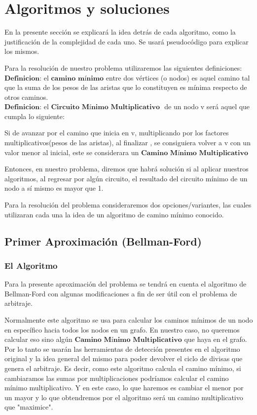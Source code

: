 \documentclass[11pt,a4paper]{article}
\begin{document}
\section{\huge Algoritmos y soluciones}

En la presente secci\'on se explicar\'a la idea detr\'as de cada algoritmo, como la justificaci\'on de la complejidad de cada uno. Se usar\'a pseudoc\'odigo para explicar los mismos.


Para la resoluci\'on de nuestro problema utilizaremos las siguientes definiciones:
\\

{\large $\textbf{Definicion:}$} el $\textbf{camino m\'inimo}$ entre dos vértices (o nodos) es aquel camino tal que la suma de los pesos de las aristas que lo constituyen es mínima respecto de otros caminos.
\\

{\large $\textbf{Definicion:}$} el $\textbf{Circuito M\'inimo Multiplicativo }$ de un nodo v ser\'a aquel que cumpla lo siguiente:

Si de avanzar por el camino que inicia en v, multiplicando por los factores multiplicativos(pesos de las aristas), al finalizar , se consiguiera volver a v con un valor menor al inicial, este se considerara un $\textbf{Camino M\'inimo Multiplicativo }$


Entonces, en nuestro problema, diremos que habr\'a soluci\'on si al aplicar nuestros algoritmos, al regresar por alg\'un circuito, el resultado del circuito m\'inimo de un nodo a s\'i mismo es mayor que 1.

Para la resoluci\'on del problema consideraremos dos opciones/variantes, las cuales utilizaran cada una la idea de un algoritmo de camino m\'inimo conocido.

\subsection{Primer Aproximaci\'on (Bellman-Ford)}
\subsubsection{El Algoritmo}

Para la presente aproximaci\'on del problema se tendr\'a en cuenta el algoritmo de Bellman-Ford con algunas modificaciones a fin de ser \'util con el problema de arbitraje.

    Normalmente este algoritmo se usa para calcular los caminos m\'inimos de un nodo en espec\'ifico hacia todos los nodos en un grafo. En nuestro caso, no queremos calcular eso sino alg\'un $\textbf{Camino M\'inimo Multiplicativo}$ que haya en el grafo. Por lo tanto se usar\'an las herramientas de detecci\'on presentes en el algoritmo original y la idea general del mismo para poder devolver el ciclo de divisas que genera el arbitraje. Es decir, como este algoritmo calcula el camino m\'inimo, si cambiaramos las sumas por multiplicaciones podr\'iamos calcular el camino m\'inimo multiplicativo. Y en este caso, lo que haremos es cambiar el menor por un mayor y lo que obtendremos por el algoritmo ser\'a un camino multiplicativo que "maximice".
\end{document}
